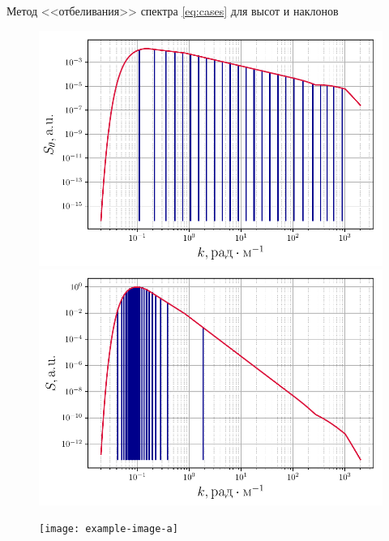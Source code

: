 \begin{frame}[t]{}
\begin{columns}[t]
\begin{column}{.48\linewidth}
\begin{block}{Метод <<отбеливания>> спектра}
                \eqref{eq:cases} для высот и наклонов
                \begin{figure}[H]
                    \begin{minipage}{0.32\linewidth}
                            \centering
                            \includegraphics[width=\linewidth]{fig/split_angles}	
                    \end{minipage}
                    \hfill
                    \begin{minipage}{0.32\linewidth}
                            \centering
                            \includegraphics[width=\linewidth]{fig/split_height}
                    \end{minipage}
                    \begin{minipage}{0.32\linewidth}
                            \centering
                            \texttt{[image: example-image-a]}
                    \end{minipage}


\end{figure}
\end{block}
\end{column}
\end{columns}
\end{frame}
